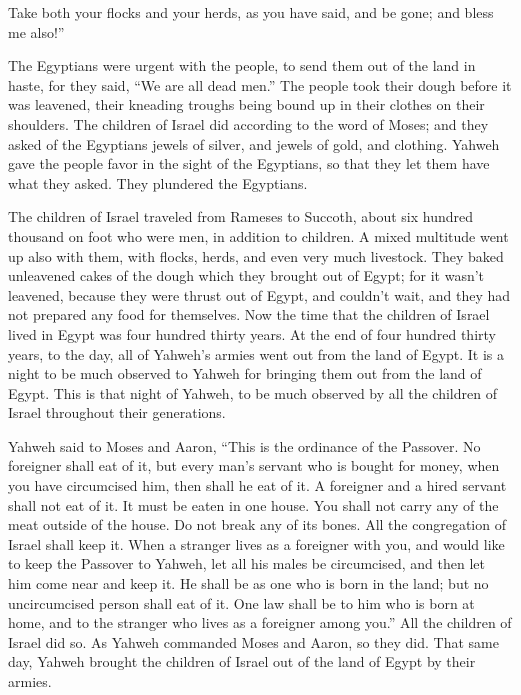 {Take both your flocks and your herds, as you have said, and be gone; and bless me also!”
\par }{\PP {}The Egyptians were urgent with the people, to send them out of the land in haste, for they said, “We are all dead men.”
The people took their dough before it was leavened, their kneading troughs being bound up in their clothes on their shoulders.
The children of Israel did according to the word of Moses; and they asked of the Egyptians jewels of silver, and jewels of gold, and clothing.
Yahweh gave the people favor in the sight of the Egyptians, so that they let them have what they asked. They plundered the Egyptians.
\par }{\PP {}The children of Israel traveled from Rameses to Succoth, about six hundred thousand on foot who were men, in addition to children.
A mixed multitude went up also with them, with flocks, herds, and even very much livestock.
They baked unleavened cakes of the dough which they brought out of Egypt; for it wasn’t leavened, because they were thrust out of Egypt, and couldn’t wait, and they had not prepared any food for themselves.
Now the time that the children of Israel lived in Egypt was four hundred thirty years.
At the end of four hundred thirty years, to the day, all of Yahweh’s armies went out from the land of Egypt.
It is a night to be much observed to Yahweh for bringing them out from the land of Egypt. This is that night of Yahweh, to be much observed by all the children of Israel throughout their generations.
\par }{\PP {}Yahweh said to Moses and Aaron, “This is the ordinance of the Passover. No foreigner shall eat of it,
but every man’s servant who is bought for money, when you have circumcised him, then shall he eat of it.
A foreigner and a hired servant shall not eat of it.
It must be eaten in one house. You shall not carry any of the meat outside of the house. Do not break any of its bones.
All the congregation of Israel shall keep it.
When a stranger lives as a foreigner with you, and would like to keep the Passover to Yahweh, let all his males be circumcised, and then let him come near and keep it. He shall be as one who is born in the land; but no uncircumcised person shall eat of it.
One law shall be to him who is born at home, and to the stranger who lives as a foreigner among you.”
All the children of Israel did so. As Yahweh commanded Moses and Aaron, so they did.
That same day, Yahweh brought the children of Israel out of the land of Egypt by their armies.

}
